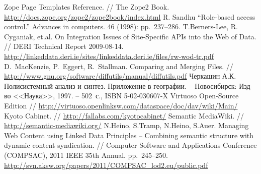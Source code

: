 \documentclass[utf8]{../IncArticle}
\begin{document}
\begin{thebibliography}{11}
 Zope Page Templates Reference. // The Zope2 Book. \url{http://docs.zope.org/zope2/zope2book/index.html}
 R. Sandhu ``Role-based access control.'' Advances in
  computers. 46 (1998): pp.~237--286.
 T.Berners-Lee, R. Cyganiak, et.al. On Integration
  Issues of Site-Specific APIs into the Web of Data. // DERI Technical
  Report
  2009-08-14. \url{http://linkeddata.deri.ie/sites/linkeddata.deri.ie/files/rw-wod-tr.pdf}
 D.~MacKenzie, P.~Eggert, R.~Stallman. Comparing and
  Merging Files. //
  \url{http://www.gnu.org/software/diffutils/manual/diffutils.pdf}
 Черкашин А.К. Полисистемный анализ и
  синтез. Приложение в географии. -- Новосибирск: Изд-во <<Наука>>,
  1997. -- 502~с., ISBN 5-02-030607-X
 Virtuoso Open-Source Edition //
  \url{http://virtuoso.openlinksw.com/dataspace/doc/dav/wiki/Main/}
 Kyoto Cabinet. // \url{http://fallabs.com/kyotocabinet/}
 Semantic MediaWiki. // \url{http://semantic-mediawiki.org/}
 N.Heino, S.Tramp, N.Heino, S.Auer. Managing Web
  Content using Linked Data Principles – Combining semantic structure
  with dynamic content syndication. // Computer Software and
  Applications Conference (COMPSAC), 2011 IEEE 35th
  Annual. pp.~245--250. \url{http://svn.aksw.org/papers/2011/COMPSAC_lod2.eu/public.pdf}

\end{thebibliography}

\end{document}
